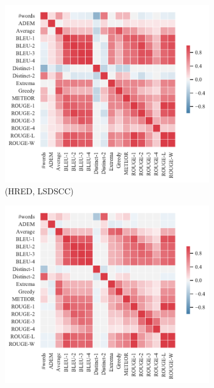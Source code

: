 \begin{figure}[htbp]
    \centering
    \begin{subfigure}{0.35\linewidth}
        \centering
        \includegraphics[width=\linewidth]{figure/plot/heatmap/v4/pearson/hred/lsdscc/plot.pdf}
        \caption{(HRED, LSDSCC)}
    \end{subfigure}%
    \begin{subfigure}{0.35\linewidth}
        \centering
        \includegraphics[width=\linewidth]{figure/plot/heatmap/v4/pearson/hred/opensub/plot.pdf}

\end{subfigure}
\end{figure}
